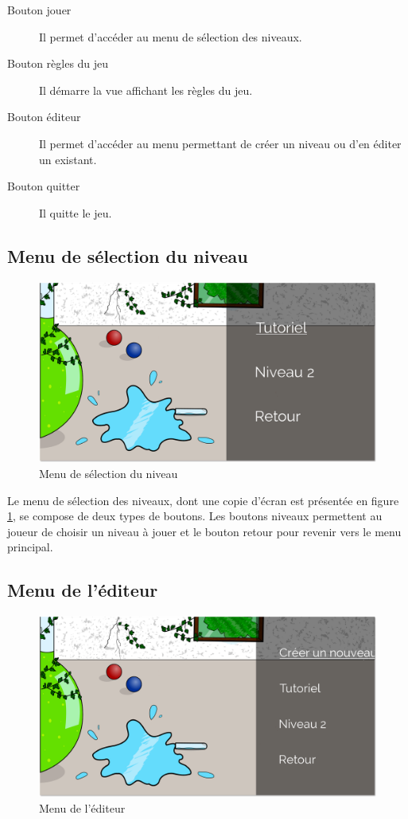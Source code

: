 \begin{description}
\item[Bouton jouer]
    Il permet d'accéder au menu de sélection des niveaux.
\item[Bouton règles du jeu]
    Il démarre la vue affichant les règles du jeu.
\item[Bouton éditeur]
    Il permet d'accéder au menu permettant de créer un niveau
    ou d'en éditer un existant.
\item[Bouton quitter]
    Il quitte le jeu.
\end{description}

\subsection{Menu de sélection du niveau}

\begin{figure}[h]
    \centering
    \includegraphics[width=13cm]{figures/manuel-menu-jouer.png}
    \caption{Menu de sélection du niveau}
    \label{fig:manuel-menu-selection}
\end{figure}

Le menu de sélection des niveaux, dont une copie d'écran est présentée
en figure \ref{fig:manuel-menu-selection}, se compose de deux types de boutons.
Les boutons niveaux permettent au joueur de choisir un niveau à jouer et
le bouton retour pour revenir vers le menu principal.

\subsection{Menu de l'éditeur}

\begin{figure} [!h]
    \centering
    \includegraphics[width=13cm]{figures/manuel-menu-editeur.png}
    \caption{Menu de l'éditeur}
    \label{fig:manuel-menu-editeur}
\end{figure}

